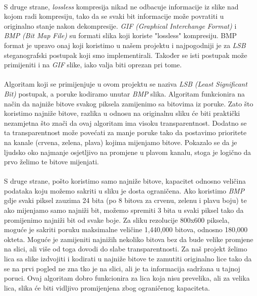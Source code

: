 \documentclass[times, utf8, seminar]{fer}
\begin{document}
\paragraph{}
S druge strane, \textit{lossless} kompresija nikad ne odbacuje informacije iz slike nad kojom radi kompresiju, tako da se svaki bit informacije može povratiti u originalno stanje nakon dekompresije. \textit{GIF (Graphical Interchange Format)} i \textit{BMP (Bit Map File)} su formati slika koji koriste "lossless" kompresiju. BMP format je upravo onaj koji koristimo u našem projektu i najpogodniji je za \textit{LSB} steganografski postupak koji smo implementirali. Također se isti postupak može primijeniti i na \textit{GIF} slike, iako valja biti oprezan pri tome.
\paragraph{}
Algoritam koji se primijenjuje u ovom projektu se naziva \textit{LSB (Least Significant Bit)} postupak, a poruke kodiramo unutar \textit{BMP} slika. Algoritam funkcionira na način da najniže bitove svakog piksela zamijenimo sa bitovima iz poruke. Zato što koristimo najniže bitove, razlika u odnosu na originalnu sliku će biti praktički nezamjetna što znači da ovaj algoritam ima visoku transparentnost. Dodatno se ta transparentnost može povećati za manje poruke tako da postavimo prioritete na kanale (crvena, zelena, plava) kojima mijenjamo bitove. Pokazalo se da je ljudsko oko najmanje osjetljivo na promjene u plavom kanalu, stoga je logično da prvo želimo te bitove mijenjati.
\paragraph{}
S druge strane, pošto koristimo samo najniže bitove, kapacitet odnosno veličina podataka koju možemo sakriti u sliku je dosta ograničena. Ako koristimo \textit{BMP} gdje svaki piksel zauzima 24 bita (po 8 bitova za crvenu, zelenu i plavu boju) te ako  mijenjamo samo najniži bit, možemo spremiti 3 bita u svaki piksel tako da promijenimo najniži bit od svake  boje. Za sliku rezolucije 800x600 piksela, moguće je sakriti poruku maksimalne veličine 1,440,000 bitova, odnosno 180,000 okteta. Moguće je zamijeniti najnižih nekoliko bitova bez da bude velike promjene na slici, ali više od toga dovodi do slabe transparentnosti. Za naš projekt želimo lica sa slike izdvojiti i kodirati u najniže bitove te zamutiti originalno lice tako da se na prvi pogled ne zna tko je na slici, ali je ta informacija sadržana u tajnoj poruci. Ovaj algoritam dobro funkcionira za lica koja nisu prevelika, ali za velika lica, slika će biti vidljivo promijenjena zbog ograničenog kapaciteta.
\end{document}
